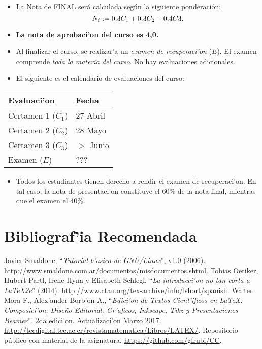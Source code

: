 \documentclass[letterpaper,11pt]{exam}
\begin{document}
\begin{multicols}{2}
\begin{itemize}
\item La Nota de FINAL ser\'a calculada seg\'un la siguiente ponderaci\'on:
{\small
\begin{equation}
N_{\rm f} :=0.3C_1+0.3C_2 + 0.4C3.
\end{equation}
}
\item \textbf{La nota de aprobaci'on del curso es 4,0.}
\item Al finalizar el curso, se realizar'a un \textit{examen de recuperaci'on} ($E$). El examen comprende \textit{toda la materia del curso}. No hay evaluaciones adicionales.

\item El siguiente es el calendario de evaluaciones del curso:
\end{itemize} 
\begin{center}
\begin{scriptsize}
\begin{tabular}{|ll|}
\hline 
Evaluaci'on &  Fecha\\
\hline
Certamen 1 ($C_1$) & 27 Abril \\ 
Certamen 2 ($C_2$) & 28 Mayo \\ 
Certamen 3 ($C_3$) & $>$ Junio\\ 
Examen ($E$) & ??? \\ 
\hline 
\end{tabular} 
\end{scriptsize}
\end{center}
\begin{itemize}
\item Todos los estudiantes tienen derecho a rendir el examen de recuperaci'on. En tal caso, la nota de presentaci'on constituye el 60\% de la nota final, mientras que el examen el 40\%.
\end{itemize}

\section{Bibliograf'ia Recomendada}

\begin{thebibliography}{77}	%
\small
{} Javier Smaldone, ``\textit{Tutorial b'asico de GNU/Linux}'',  v1.0 (2006).
\url{http://www.smaldone.com.ar/documentos/misdocumentos.shtml}.
 Tobias Oetiker, Hubert Partl, Irene Hyna y Elisabeth Schlegl, ``\textit{La introducci'on no-tan-corta a \LaTeX 2e}'' (2014). \url{http://www.ctan.org/tex-archive/info/lshort/spanish}.
 Walter Mora F., Alex'ander Borb'on A., ``\textit{Edici'on de Textos Cient'ificos en \LaTeX: Composici'on, Dise\~no Editorial, Gr'aficos, Inkscape, Tikz y Presentaciones Beamer}'', 2da edici'on. Actualizaci'on Marzo 2017. \url{http://tecdigital.tec.ac.cr/revistamatematica/Libros/LATEX/}.
 Repositorio p\'ublico con material de la asignatura. \url{https://github.com/gfrubi/CC}.
\end{thebibliography}	


\end{multicols}
\end{document}
